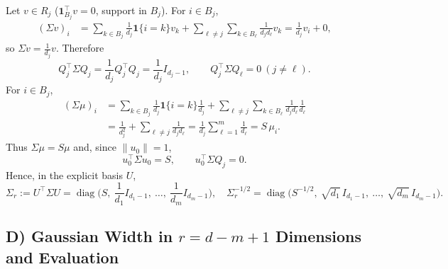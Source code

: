 Let \(v\in R_j\) (\(\mathbf 1_{B_j}^\top v=0\), support in \(B_j\)). For \(i\in B_j\),
\begin{align*}\label{eq:Sigma-on-Uj}
(\Sigma v)_i
&=\sum_{k\in B_j}\frac1{d_j}\mathbf 1\{i=k\}v_k
+\sum_{\ell\neq j}\sum_{k\in B_\ell}\frac1{d_j d_\ell}v_k
=\frac1{d_j}v_i+0,
\end{align*}
so \(\Sigma v=\frac1{d_j}v\). Therefore
\begin{equation}\label{eq:Q-blocks}
Q_j^\top \Sigma Q_j=\frac1{d_j}Q_j^\top Q_j=\frac1{d_j}I_{d_j-1},
\qquad
Q_j^\top \Sigma Q_\ell=0\ (j\neq \ell).\nonumber
\end{equation}
For \(i\in B_j\),
\begin{align*}\label{eq:Sigma-mu}
(\Sigma\mu)_i
&=\sum_{k\in B_j}\frac1{d_j}\mathbf 1\{i=k\}\frac1{d_j}
+\sum_{\ell\neq j}\sum_{k\in B_\ell}\frac1{d_j d_\ell}\frac1{d_\ell}\\
&=\frac1{d_j^2}+\sum_{\ell\neq j}\frac1{d_j d_\ell}
=\frac1{d_j}\sum_{\ell=1}^m\frac1{d_\ell}
=S\,\mu_i.
\end{align*}
Thus \(\Sigma\mu=S\mu\) and, since \(\|u_0\|=1\),
\begin{equation}\label{eq:u0-eigs}
u_0^\top\Sigma u_0 = S,\qquad u_0^\top\Sigma Q_j = 0.\nonumber
\end{equation}
Hence, in the explicit basis \(U\),
\begin{equation}\label{eq:Sigma_r}
\Sigma_r
:=U^\top\Sigma U
=
\operatorname{diag}\Big(S,\ \frac1{d_1}I_{d_1-1},\ \dots,\ \frac1{d_m}I_{d_m-1}\Big),
\quad
\Sigma_r^{-1/2}
=
\operatorname{diag}\Big(S^{-1/2},\ \sqrt{d_1}\,I_{d_1-1},\ \dots,\ \sqrt{d_m}\,I_{d_m-1}\Big).
\end{equation}

\bigskip

\subsection*{D) Gaussian Width in \(r=d-m+1\) Dimensions and Evaluation}

